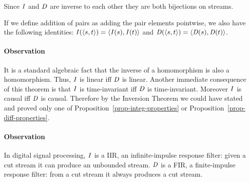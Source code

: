 Since $\mathit{I}$ and $\mathit{D}$ are inverse to each other they are both bijections on streams.

If we define addition of pairs as adding the pair elements pointwise, we also have
the following identities: $\mathit{I}(\langle s,t \rangle) = \langle \mathit{I}(s),\mathit{I}(t) \rangle$ and $\mathit{D}(\langle s,t \rangle) = \langle \mathit{D}(s),\mathit{D}(t) \rangle$.

\paragraph{Observation}
It is a standard algebraic fact that the inverse of a homomorphism is also a homomorphism. 
Thus, $\mathit{I}$ is linear iff $\mathit{D}$ is linear. Another immediate consequence of this theorem is that $\mathit{I}$ is time-invariant iff
$\mathit{D}$ is time-invariant. 
Moreover $\mathit{I}$ is causal iff
$\mathit{D}$ is causal. Therefore by the Inversion Theorem we could have stated and proved only one of Proposition~\ref{prop-integ-properties} or
Proposition~\ref{prop-diff-properties}.


\paragraph{Observation} In digital signal processing, $\mathit{I}$ is a IIR, an infinite-impulse response filter: given a cut stream it can produce an unbounded stream.  $\mathit{D}$ is a FIR, a finite-impulse response filter: from a cut stream it always produces a cut stream.


\begin{comment}
\begin{lemma}
  The operators $\I$ and $\D$ are linear.
\end{lemma}
\begin{proof}
  $\D$ is the composition of three linear 
  operators.Let us prove the statement for $\I$.
  $$
\begin{aligned}
  (\I(a + b))[t] &= \sum_{k \leq t}(a + b)[t] & \mbox{ definition of }\D \\
  &= \sum_{k \leq t} a[k] + \sum_{k \leq t} b[k] & \mbox{ commutativity, linearity of + } \\
  &= \I(a)[t] + \I(b)[t] & \mbox{ definition of }\I.
\end{aligned}
$$

An alternative proof: using the linearity of $\zm$ we can show 
that $\alpha=\I(a)+\I(b)$ satisfies $\alpha = \zm(\alpha) + a+b$.
It follows that $\alpha=\I(a+b)$.
\end{proof}

By substituting $a + b$ with $a + (-b)$ we obtain that $\I(a - b) = \I(a) - \I(b)$, 
$\D(a - b) = \D(a) - \D(b)$ and $\zm(a - b) = \zm(a) - \zm(b)$.
\end{comment}

